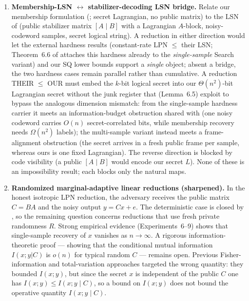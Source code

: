 \documentclass[11pt,a4paper]{article}
\theoremstyle{plain}
\theoremstyle{definition}
\begin{document}
\begin{enumerate}
\item \textbf{Membership-LSN $\leftrightarrow$ stabilizer-decoding LSN bridge.} Relate our membership formulation (; secret Lagrangian, no public matrix) to the LSN of \cite{KLP+25,LPQR26} (public stabilizer matrix $[A \mid B]$ with a Lagrangian $A$-block, noisy-codeword samples, secret logical string). A reduction in either direction would let the external hardness results (constant-rate LPN $\le$ their LSN; Theorem~6.6 of \cite{KLP+25} attaches this hardness already to the \emph{single-sample} Search variant) and our SQ lower bounds support a \emph{single} object; absent a bridge, the two hardness cases remain parallel rather than cumulative. A reduction THEIR $\le$ OUR must embed the $k$-bit logical secret into our $\Theta(n^2)$-bit Lagrangian secret without the junk register that \cite{KLP+25} (Lemma~6.5) exploit to bypass the analogous dimension mismatch: from the single-sample hardness carrier it meets an information-budget obstruction shared with  (one noisy codeword carries $O(n)$ secret-correlated bits, while membership recovery needs $\Omega(n^2)$ labels); the multi-sample variant instead meets a frame-alignment obstruction (the secret arrives in a fresh public frame per sample, whereas ours is one fixed Lagrangian). The reverse direction is blocked by code visibility (a public $[A \mid B]$ would encode our secret $L$). None of these is an impossibility result; each blocks only the natural maps.

\item \textbf{Randomized marginal-adaptive linear reductions (sharpened).} \label{open:marginal-adaptive} In the honest isotropic LPN reduction, the adversary receives the public matrix $C=BA$ and the noisy output $y=Cx+e$.  The deterministic case is closed by , so the remaining question concerns reductions that use fresh private randomness $R$.  Strong empirical evidence (Experiments~6--9) shows that single-sample recovery of $x$ vanishes as $n\to\infty$.  A rigorous information-theoretic proof --- showing that the conditional mutual information $I(x;y|C)$ is $o(n)$ for typical random $C$ --- remains open.  Previous Fisher-information and total-variation approaches targeted the wrong quantity: they bounded $I(x;y)$, but since the secret $x$ is independent of the public $C$ one has $I(x;y) \le I(x;y\mid C)$, so a bound on $I(x;y)$ does not bound the operative quantity $I(x;y\mid C)$.


\end{enumerate}
\end{document}
